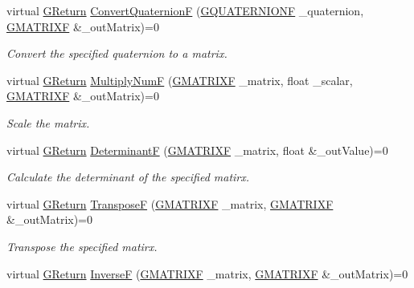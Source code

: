 \begin{DoxyCompactItemize}
virtual \hyperlink{namespaceGW_a67a839e3df7ea8a5c5686613a7a3de21}{G\+Return} \hyperlink{classGW_1_1MATH_1_1GMatrix_aded7d8a4b4cd54c3fc7f43bab1ed0730}{Convert\+QuaternionF} (\hyperlink{structGW_1_1MATH_1_1GQUATERNIONF}{G\+Q\+U\+A\+T\+E\+R\+N\+I\+O\+NF} \+\_\+quaternion, \hyperlink{structGW_1_1MATH_1_1GMATRIXF}{G\+M\+A\+T\+R\+I\+XF} \&\+\_\+out\+Matrix)=0
\begin{DoxyCompactList}\small\item\em Convert the specified quaternion to a matrix. \end{DoxyCompactList}\item 
virtual \hyperlink{namespaceGW_a67a839e3df7ea8a5c5686613a7a3de21}{G\+Return} \hyperlink{classGW_1_1MATH_1_1GMatrix_ab2560c150812cd88dd631e533ea5f9dc}{Multiply\+NumF} (\hyperlink{structGW_1_1MATH_1_1GMATRIXF}{G\+M\+A\+T\+R\+I\+XF} \+\_\+matrix, float \+\_\+scalar, \hyperlink{structGW_1_1MATH_1_1GMATRIXF}{G\+M\+A\+T\+R\+I\+XF} \&\+\_\+out\+Matrix)=0
\begin{DoxyCompactList}\small\item\em Scale the matrix. \end{DoxyCompactList}\item 
virtual \hyperlink{namespaceGW_a67a839e3df7ea8a5c5686613a7a3de21}{G\+Return} \hyperlink{classGW_1_1MATH_1_1GMatrix_a8ae14af67e2b099569a4439b7497b37d}{DeterminantF} (\hyperlink{structGW_1_1MATH_1_1GMATRIXF}{G\+M\+A\+T\+R\+I\+XF} \+\_\+matrix, float \&\+\_\+out\+Value)=0
\begin{DoxyCompactList}\small\item\em Calculate the determinant of the specified matirx. \end{DoxyCompactList}\item 
virtual \hyperlink{namespaceGW_a67a839e3df7ea8a5c5686613a7a3de21}{G\+Return} \hyperlink{classGW_1_1MATH_1_1GMatrix_ae1865f48ec9187b508cbcfe083496581}{TransposeF} (\hyperlink{structGW_1_1MATH_1_1GMATRIXF}{G\+M\+A\+T\+R\+I\+XF} \+\_\+matrix, \hyperlink{structGW_1_1MATH_1_1GMATRIXF}{G\+M\+A\+T\+R\+I\+XF} \&\+\_\+out\+Matrix)=0
\begin{DoxyCompactList}\small\item\em Transpose the specified matirx. \end{DoxyCompactList}\item 
virtual \hyperlink{namespaceGW_a67a839e3df7ea8a5c5686613a7a3de21}{G\+Return} \hyperlink{classGW_1_1MATH_1_1GMatrix_a47cbc24d8a15f8cf605f6585c8b44e2e}{InverseF} (\hyperlink{structGW_1_1MATH_1_1GMATRIXF}{G\+M\+A\+T\+R\+I\+XF} \+\_\+matrix, \hyperlink{structGW_1_1MATH_1_1GMATRIXF}{G\+M\+A\+T\+R\+I\+XF} \&\+\_\+out\+Matrix)=0

\end{DoxyCompactItemize}
